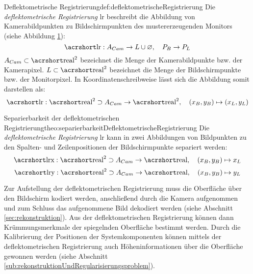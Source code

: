 %
\begin{Definition}{Deflektometrische Registrierung}{def:deflektometrischeRegistrierung}
	Die \textit{deflektometrische Registrierung} \acrshort{lr} beschreibt die Abbildung von Kamerabildpunkten zu Bildschirmpunkten des mustererzeugenden Monitors \cite{kit_werling} (siehe Abbildung \ref{tikz:abbAbbildungssystem}):
	\begin{equation*}
		\acrshortmath{lr} : A_{Cam} \rightarrow L \cup \varnothing ,\quad P_{B} \rightarrow P_{L}
	\end{equation*}
	$ A_{Cam} \subset \acrshortmath{real}^{2} $ bezeichnet die Menge der Kamerabildpunkte bzw. der Kamerapixel.
	$ L \subset \acrshortmath{real}^{2} $ bezeichnet die Menge der Bildschirmpunkte bzw. der Monitorpixel.
	In Koordinatenschreibweise lässt sich die Abbildung somit darstellen als:
	\begin{equation*}
		\acrshortmath{lr} : \acrshortmath{real}^{2} \supset A_{Cam} \rightarrow \acrshortmath{real}^2 ,\quad (x_{B}, y_{B}) \mapsto (x_{L}, y_{L})
	\end{equation*}
\end{Definition}
%
{
	\begin{figure}[H]
		\centering
		
		\label{tikz:abbAbbildungssystem}
	\end{figure}
}
%
\begin{Satz}{Separierbarkeit der deflektometrischen Registrierung}{theo:separierbarkeitDeflektometrischeRegistrierung}
Die \textit{deflektometrische Registrierung} \acrshort{lr} kann in zwei Abbildungen von Bildpunkten zu den Spalten- und Zeilenpositionen der Bildschirmpunkte separiert werden:
	\begin{equation*}
		\acrshortmath{lrx} : \acrshortmath{real}^{2} \supset A_{Cam} \rightarrow \acrshortmath{real} ,\quad (x_{B}, y_{B}) \mapsto x_{L}
	\end{equation*}
	\begin{equation*}
		\acrshortmath{lry} : \acrshortmath{real}^{2} \supset A_{Cam} \rightarrow \acrshortmath{real} ,\quad (x_{B}, y_{B}) \mapsto y_{L}
	\end{equation*}
\end{Satz}

\noindent
Zur Aufstellung der deflektometrischen Registrierung muss die Oberfläche über den Bildschirm kodiert werden, anschließend durch die Kamera aufgenommen und zum Schluss das aufgenommene Bild dekodiert werden (siehe Abschnitt \ref{sec:rekonstruktion}).
Aus der deflektometrischen Registrierung können dann Krümmungsmerkmale der spiegelnden Oberfläche bestimmt werden.
Durch die Kalibrierung der Positionen der Systemkomponenten können mittels der deflektometrischen Registrierung auch Höheninformationen über die Oberfläche gewonnen werden (siehe Abschnitt \ref{sub:rekonstruktionUndRegularisierungsproblem}).

